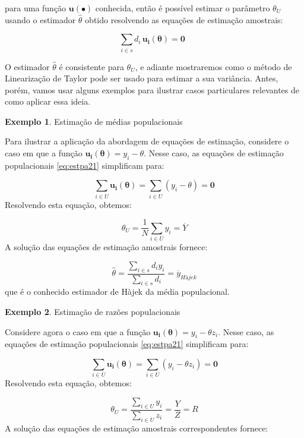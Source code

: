 \documentclass[
  12pt,
  brazilian,
]{book}
\theoremstyle{definition}
\theoremstyle{definition}
\newtheorem{example}{Exemplo}[chapter]
\theoremstyle{definition}
\theoremstyle{definition}
\theoremstyle{remark}
\begin{document}
para uma função \(\mathbf{u(\bullet)}\) conhecida, então é possível estimar o parâmetro \(\theta_U\) usando o estimador \(\widehat \theta\) obtido resolvendo as equações de estimação amostrais:

\begin{equation}
\sum_{i \in s} d_i \, \mathbf{u_i(\theta)} = \mathbf{0}  \,\,\, \label{eq:estpa22}
\end{equation}

O estimador \(\widehat \theta\) é consistente para \(\theta_U\), e adiante mostraremos como o método de Linearização de Taylor pode ser usado para estimar a sua variância. Antes, porém, vamos usar alguns exemplos para ilustrar casos particulares relevantes de como aplicar essa ideia.

\begin{example}
\protect\hypertarget{exm:exe32}{}{\label{exm:exe32} }Estimação de médias populacionais
\end{example}

Para ilustrar a aplicação da abordagem de equações de estimação, considere o caso em que a função \(\mathbf{u_i(\theta)} = y_i - \theta\). Nesse caso, as equações de estimação populacionais \eqref{eq:estpa21} simplificam para:

\[
\sum_{i \in U} \mathbf{u_i(\theta)} = \sum_{i \in U} (y_i - \theta) = \mathbf{0}
\]
Resolvendo esta equação, obtemos:

\[
\theta_U = \frac{1}{N} \sum_{i \in U} y_i = \overline{Y}
\]
A solução das equações de estimação amostrais fornece:

\[
\widehat \theta = \frac{\sum_{i \in s} d_i y_i}{{\sum_{i \in s} d_i}} = \overline{y}_{Hàjek}
\]
que é o conhecido estimador de Hàjek da média populacional.

\begin{example}
\protect\hypertarget{exm:exe33}{}{\label{exm:exe33} }Estimação de razões populacionais
\end{example}

Considere agora o caso em que a função \(\mathbf{u_i(\theta)} = y_i - \theta z_i\). Nesse caso, as equações de estimação populacionais \eqref{eq:estpa21} simplificam para:

\[
\sum_{i \in U} \mathbf{u_i(\theta)} = \sum_{i \in U} (y_i - \theta z_i) = \mathbf{0}
\]
Resolvendo esta equação, obtemos:

\[
\theta_U = \frac{\sum_{i \in U} y_i}{\sum_{i \in U} z_i} = \frac{Y}{Z} = R
\]
A solução das equações de estimação amostrais correspondentes fornece:
\end{document}
